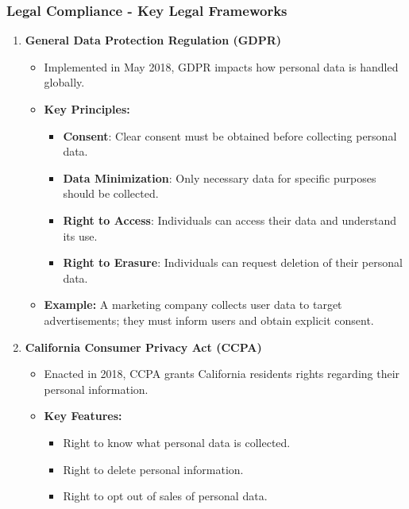 \documentclass{beamer}
\begin{document}
\begin{frame}[fragile]
    \frametitle{Legal Compliance - Key Legal Frameworks}
    \begin{enumerate}
        \item \textbf{General Data Protection Regulation (GDPR)}
        \begin{itemize}
            \item Implemented in May 2018, GDPR impacts how personal data is handled globally.
            \item \textbf{Key Principles:}
            \begin{itemize}
                \item \textbf{Consent}: Clear consent must be obtained before collecting personal data.
                \item \textbf{Data Minimization}: Only necessary data for specific purposes should be collected.
                \item \textbf{Right to Access}: Individuals can access their data and understand its use.
                \item \textbf{Right to Erasure}: Individuals can request deletion of their personal data.
            \end{itemize}
            \item \textbf{Example:} A marketing company collects user data to target advertisements; they must inform users and obtain explicit consent.
        \end{itemize}
        
        \item \textbf{California Consumer Privacy Act (CCPA)}
        \begin{itemize}
            \item Enacted in 2018, CCPA grants California residents rights regarding their personal information.
            \item \textbf{Key Features:}
            \begin{itemize}
                \item Right to know what personal data is collected.
                \item Right to delete personal information.
                \item Right to opt out of sales of personal data.
            \end{itemize}
        \end{itemize}
    \end{enumerate}
\end{frame}
\end{document}
